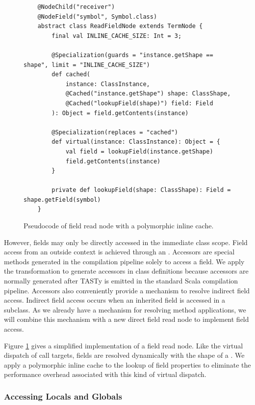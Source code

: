 \begin{figure}[!htb]
	\begin{verbatim}
	@NodeChild("receiver")
	@NodeField("symbol", Symbol.class)
	abstract class ReadFieldNode extends TermNode {
		final val INLINE_CACHE_SIZE: Int = 3;
			
		@Specialization(guards = "instance.getShape == shape", limit = "INLINE_CACHE_SIZE")
		def cached(
			instance: ClassInstance,
			@Cached("instance.getShape") shape: ClassShape,
			@Cached("lookupField(shape)") field: Field
		): Object = field.getContents(instance)
			
		@Specialization(replaces = "cached")
		def virtual(instance: ClassInstance): Object = {
			val field = lookupField(instance.getShape)
			field.getContents(instance)
		}
	
		private def lookupField(shape: ClassShape): Field = shape.getField(symbol)
	}
	\end{verbatim}
	\caption{Pseudocode of field read node with a polymorphic inline cache.}
	\label{impl:field-read-node}
\end{figure}

However, fields may only be directly accessed in the immediate class scope.
Field access from an outside context is achieved through an .
Accessors are special methods generated in the compilation pipeline solely to access a field.
We apply the transformation to generate accessors in class definitions because accessors are normally generated after TASTy is emitted in the standard Scala compilation pipeline.
Accessors also conveniently provide a mechanism to resolve indirect field access.
Indirect field access occurs when an inherited field is accessed in a subclass.
As we already have a mechanism for resolving method applications, we will combine this mechanism with a new direct field read node to implement field access.

Figure \ref{impl:field-read-node} gives a simplified implementation of a field read node.
Like the virtual dispatch of call targets, fields are resolved dynamically with the shape of a .
We apply a polymorphic inline cache to the lookup of field properties to eliminate the performance overhead associated with this kind of virtual dispatch.

\subsubsection*{Accessing Locals and Globals}

